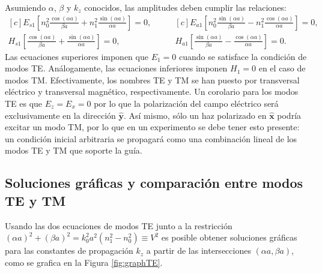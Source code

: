 Asumiendo $\alpha$, $\beta$ y $k_z$ conocidos, las amplitudes deben cumplir las relaciones:
\begin{equation*}
	\begin{aligned}[c]
	E_{s1} \left[n_0^2 \frac{\cos(\alpha a)}{\beta a}+n_1 ^2 \frac{\sin(\alpha a)}{\alpha a}\right] = 0,
		\\
	H_{s1} \left[\frac{\cos(\alpha a)}{\beta a} + \frac{\sin(\alpha a)}{\alpha a} \right] = 0,
\end{aligned} 
\quad\quad
	\begin{aligned}[c]
	E_{a1} \left[ n_0^2\frac{\sin(\alpha a)}{\beta a} - n_1^2\frac{\cos(\alpha a)}{\alpha a}\right] = 0,
		\\
	H_{a1} \left[ \frac{\sin(\alpha a)}{\beta a} - \frac{\cos(\alpha a)}{\alpha a}\right] = 0.
\end{aligned} 
\end{equation*}
Las ecuaciones superiores imponen que $E_1 = 0$ cuando se satisface la condición de modos TE. Análogamente, las ecuaciones inferiores imponen $H_1 = 0$ en el caso de modos TM. Efectivamente, los nombres TE y TM se han puesto por transversal eléctrico y transversal magnético, respectivamente.
Un corolario para los modos TE es que $E_z = E_x = 0$ por lo que la polarización del campo eléctrico será exclusivamente en la dirección $\hat{\textbf{y}}$. Así mismo, sólo un haz polarizado en $\hat{\textbf{x}}$ podría excitar un modo TM, por lo que en un experimento se debe tener esto presente: un condición inicial arbitraria se propagará como una combinación lineal de los modos TE y TM que soporte la guía.

\subsection{Soluciones gráficas y comparación entre modos TE y TM \label{cap:solslabTETM}}

Usando las dos ecuaciones de modos TE junto a la restricción $(\alpha a)^2 + (\beta a)^2 = k_0^2 a^2(n_1^2 - n_0^2) \equiv V^2$ es posible obtener soluciones gráficas para las constantes de propagación $k_z$ a partir de las intersecciones $(\alpha a, \beta a)$, como se grafica en la Figura \ref{fig:graphTE}. 

